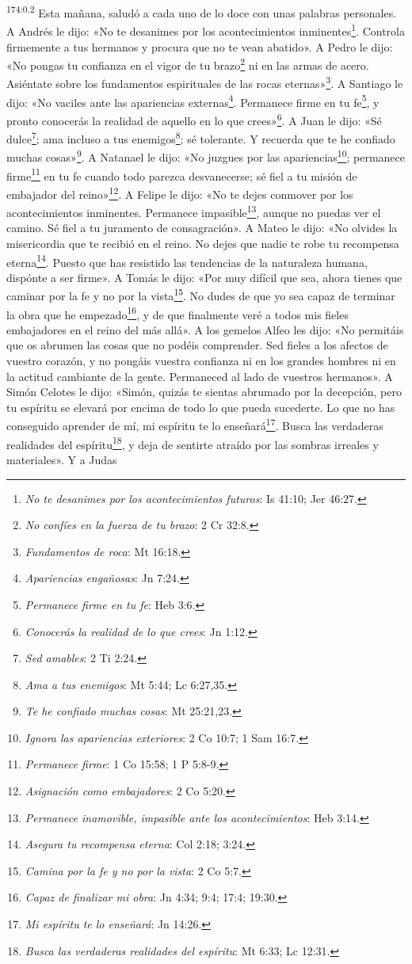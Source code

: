 \par 
\textsuperscript{174:0.2} Esta mañana, saludó a cada uno de lo doce con unas palabras personales. A Andrés le dijo: «No te desanimes por los acontecimientos inminentes\footnote{\textit{No te desanimes por los acontecimientos futuros}: Is 41:10; Jer 46:27.}. Controla firmemente a tus hermanos y procura que no te vean abatido». A Pedro le dijo: «No pongas tu confianza en el vigor de tu brazo\footnote{\textit{No confíes en la fuerza de tu brazo}: 2 Cr 32:8.} ni en las armas de acero. Asiéntate sobre los fundamentos espirituales de las rocas eternas»\footnote{\textit{Fundamentos de roca}: Mt 16:18.}. A Santiago le dijo: «No vaciles ante las apariencias externas\footnote{\textit{Apariencias engañosas}: Jn 7:24.}. Permanece firme en tu fe\footnote{\textit{Permanece firme en tu fe}: Heb 3:6.}, y pronto conocerás la realidad de aquello en lo que crees»\footnote{\textit{Conocerás la realidad de lo que crees}: Jn 1:12.}. A Juan le dijo: «Sé dulce\footnote{\textit{Sed amables}: 2 Ti 2:24.}; ama incluso a tus enemigos\footnote{\textit{Ama a tus enemigos}: Mt 5:44; Lc 6:27,35.}; sé tolerante. Y recuerda que te he confiado muchas cosas»\footnote{\textit{Te he confiado muchas cosas}: Mt 25:21,23.}. A Natanael le dijo: «No juzgues por las apariencias\footnote{\textit{Ignora las apariencias exteriores}: 2 Co 10:7; 1 Sam 16:7.}; permanece firme\footnote{\textit{Permanece firme}: 1 Co 15:58; 1 P 5:8-9.} en tu fe cuando todo parezca desvanecerse; sé fiel a tu misión de embajador del reino»\footnote{\textit{Asignación como embajadores}: 2 Co 5:20.}. A Felipe le dijo: «No te dejes conmover por los acontecimientos inminentes. Permanece impasible\footnote{\textit{Permanece inamovible, impasible ante los acontecimientos}: Heb 3:14.}, aunque no puedas ver el camino. Sé fiel a tu juramento de consagración». A Mateo le dijo: «No olvides la misericordia que te recibió en el reino. No dejes que nadie te robe tu recompensa eterna\footnote{\textit{Asegura tu recompensa eterna}: Col 2:18; 3:24.}. Puesto que has resistido las tendencias de la naturaleza humana, dispónte a ser firme». A Tomás le dijo: «Por muy difícil que sea, ahora tienes que caminar por la fe y no por la vista\footnote{\textit{Camina por la fe y no por la vista}: 2 Co 5:7.}. No dudes de que yo sea capaz de terminar la obra que he empezado\footnote{\textit{Capaz de finalizar mi obra}: Jn 4:34; 9:4; 17:4; 19:30.}, y de que finalmente veré a todos mis fieles embajadores en el reino del más allá». A los gemelos Alfeo les dijo: «No permitáis que os abrumen las cosas que no podéis comprender. Sed fieles a los afectos de vuestro corazón, y no pongáis vuestra confianza ni en los grandes hombres ni en la actitud cambiante de la gente. Permaneced al lado de vuestros hermanos». A Simón Celotes le dijo: «Simón, quizás te sientas abrumado por la decepción, pero tu espíritu se elevará por encima de todo lo que pueda sucederte. Lo que no has conseguido aprender de mí, mi espíritu te lo enseñará\footnote{\textit{Mi espíritu te lo enseñará}: Jn 14:26.}. Busca las verdaderas realidades del espíritu\footnote{\textit{Busca las verdaderas realidades del espíritu}: Mt 6:33; Lc 12:31.}, y deja de sentirte atraído por las sombras irreales y materiales». Y a Judas 
